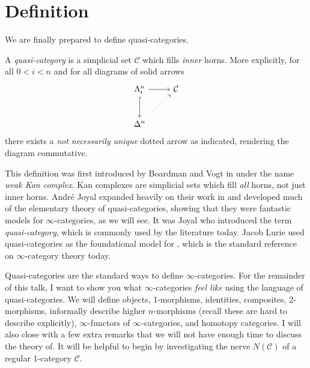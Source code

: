 \section{Definition}

We are finally prepared to define quasi-categories.

\begin{definition}\label{5.1}
	A \emph{quasi-category} is a simplicial set $\mathcal{C} $ which fills \emph{inner} horns. More explicitly, for all $0<i<n$ and for all diagrams of solid arrows
	\[\begin{tikzcd}[row sep = 2.5em, column sep = 2.5em]
	\Lambda _i^n\ar[r] \ar[hook, d]  & \mathcal{C}  \\
	\Delta ^n \ar[dotted, ur]  & 
	\end{tikzcd}\]
	there exists a \emph{not necessarily unique} dotted arrow as indicated, rendering the diagram commutative.
\end{definition}

This definition was first introduced by Boardman and Vogt in \cite{BV73} under the name \emph{weak Kan complex}. Kan complexes are simplicial sets which fill \emph{all} horns, not just inner horns. Andr\'e Joyal expanded heavily on their work in \cite{joyal1,joyal2} and developed much of the elementary theory of quasi-categories, showing that they were fantastic models for $\infty $-categories, as we will see. It was Joyal who introduced the term \emph{quasi-category}, which is commonly used by the literature today. Jacob Lurie used quasi-categories as the foundational model for \cite{htt}, which is the standard reference on $\infty $-category theory today.

Quasi-categories are the standard ways to define $\infty $-categories. For the remainder of this talk, I want to show you what $\infty $-categories \emph{feel like} using the language of quasi-categories. We will define objects, 1-morphisms, identities, composites, 2-morphisms, informally describe higher $n$-morphisms (recall these are hard to describe explicitly), $\infty $-functors of $\infty $-categories, and homotopy categories. I will also close with a few extra remarks that we will not have enough time to discuss the theory of. It will be helpful to begin by investigating the nerve $N(\mathcal{C} )$ of a regular 1-category $\mathcal{C} $.

